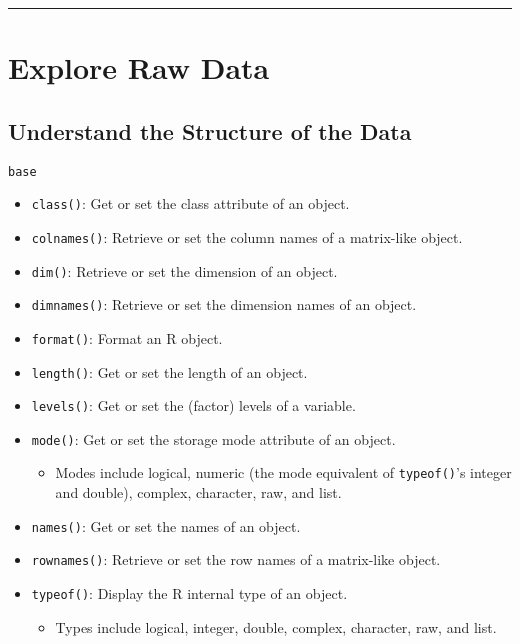 \documentclass[]{book}
\providecommand{\tightlist}{%
  \setlength{\itemsep}{0pt}\setlength{\parskip}{0pt}}
\theoremstyle{definition}
\theoremstyle{definition}
\theoremstyle{definition}
\theoremstyle{remark}
\begin{document}
\begin{center}\rule{0.5\linewidth}{\linethickness}\end{center}

\section{Explore Raw Data}\label{explore-raw-data}

\subsection{Understand the Structure of the
Data}\label{understand-the-structure-of-the-data}

\texttt{base}

\begin{itemize}
\tightlist
\item
  \texttt{class()}: Get or set the class attribute of an object.
\item
  \texttt{colnames()}: Retrieve or set the column names of a matrix-like
  object.
\item
  \texttt{dim()}: Retrieve or set the dimension of an object.
\item
  \texttt{dimnames()}: Retrieve or set the dimension names of an object.
\item
  \texttt{format()}: Format an R object.
\item
  \texttt{length()}: Get or set the length of an object.
\item
  \texttt{levels()}: Get or set the (factor) levels of a variable.
\item
  \texttt{mode()}: Get or set the storage mode attribute of an object.

  \begin{itemize}
  \tightlist
  \item
    Modes include logical, numeric (the mode equivalent of
    \texttt{typeof()}'s integer and double), complex, character, raw,
    and list.
  \end{itemize}
\item
  \texttt{names()}: Get or set the names of an object.
\item
  \texttt{rownames()}: Retrieve or set the row names of a matrix-like
  object.
\item
  \texttt{typeof()}: Display the R internal type of an object.

  \begin{itemize}
  \tightlist
  \item
    Types include logical, integer, double, complex, character, raw, and
    list.
  \end{itemize}
\end{itemize}
\end{document}
